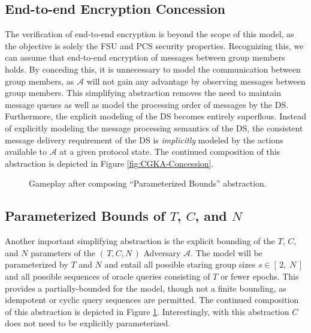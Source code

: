 \documentclass[runningheads]{llncs}
\newcommand{\Abrev}[1]{\gls{#1}}
\newcommand{\Adversary}{\ensuremath{\mathcal{A}}\xspace}
\newcommand{\NumericRange}[2]{\ensuremath{\left[\,#1,\; #2\,\right]}\xspace}
\begin{document}


\subsection{End-to-end Encryption Concession}

The verification of end-to-end encryption is beyond the scope of this model, as the objective is solely the \Abrev{FSU} and \Abrev{PCS} security properties.
Recognizing this, we can assume that end-to-end encryption of messages between group members holds.
By conceding this, it is unnecessary to model the communication between group members, as \Adversary will not gain any advantage by observing messages between group members.
This simplifying abstraction removes the need to maintain message queues as well as model the processing order of messages by the \Abrev{DS}.
Furthermore, the explicit modeling of the \Abrev{DS} becomes entirely superflous.
Instead of explicitly modeling the message processing semantics of the \Abrev{DS}, the consistent message delivery requirement  of the \Abrev{DS} is \emph{implicitly} modeled by the actions available to \Adversary at a given protocol state.
The continued composition of this abstraction is depicted in Figure \ref{fig:CGKA-Concession}.

\begin{figure}%
\centering
{}
\caption[Transition graph of informal CGKA definition]{%
\label{fig:CGKA-Concession}%
Gameplay after composing ``End-to-end Encryption Concession'' abstraction.%
}%
\vfill
{}
\caption[Transition graph of informal CGKA definition]{%
\label{fig:CGKA-Parameterized}%
Gameplay after composing ``Parameterized Bounds'' abstraction.%
}%
\end{figure}


\subsection{Parameterized Bounds of $T$, $C$, and $N$}

Another important simplifying abstraction is the explicit bounding of the $T$, $C$, and $N$ parameters of the \((\,T, C, N\,)\) Adversary \Adversary.
The model will be parameterized by $T$ and $N$ and entail all possible staring group sizes $s \in \NumericRange{2}{N}$ and all possible sequences of oracle queries consisting of $T$ or fewer epochs.
This provides a partially-bounded for the model, though not a finite bounding, as idempotent or cyclic query sequences are permitted.
The continued composition of this abstraction is depicted in Figure \ref{fig:CGKA-Parameterized}.
Interestingly, with this abstraction $C$ does not need to be explicitly parameterized.
\end{document}

